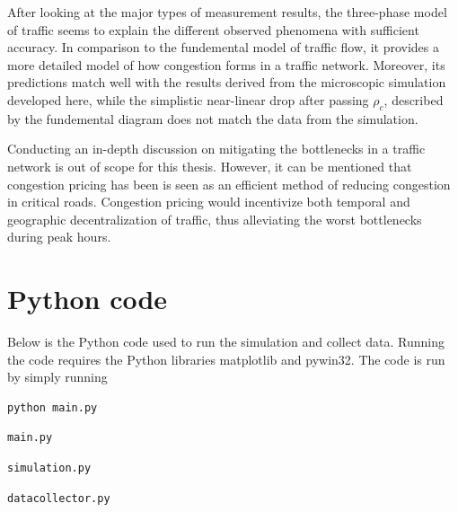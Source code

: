 \documentclass[english, 12pt, a4paper, elec, utf8, pdfa, online]{aaltothesis}
\begin{document}
After looking at the major types of measurement results, the three-phase model of traffic seems to explain the different observed phenomena with sufficient accuracy. In comparison to the fundemental model of traffic flow, it provides a more detailed model of how congestion forms in a traffic network. Moreover, its predictions match well with the results derived from the microscopic simulation developed here, while the simplistic near-linear drop after passing $\rho_c$, described by the fundemental diagram does not match the data from the simulation.

Conducting an in-depth discussion on mitigating the bottlenecks in a traffic network is out of scope for this thesis. However, it can be mentioned that congestion pricing has been is seen as an efficient method of reducing congestion in critical roads. Congestion pricing would incentivize both temporal and geographic decentralization of traffic, thus alleviating the worst bottlenecks during peak hours. \cite{congestionpricing}

\clearpage

\thesisbibliography

{}


\clearpage

\thesisappendix

\section{Python code} \label{code}

Below is the Python code used to run the simulation and collect data. Running the code requires the Python libraries matplotlib and pywin32. The code is run by simply running \begin{verbatim}python main.py\end{verbatim}

\begin{verbatim}main.py\end{verbatim}


\begin{verbatim}simulation.py\end{verbatim}


\begin{verbatim}datacollector.py\end{verbatim}

\end{document}
